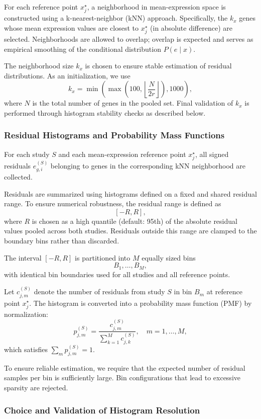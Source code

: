 For each reference point $x^\star_j$, a neighborhood in mean-expression space is constructed using a k-nearest-neighbor (kNN) approach. Specifically, the $k_x$ genes whose mean expression values are closest to $x^\star_j$ (in absolute difference) are selected. Neighborhoods are allowed to overlap; overlap is expected and serves as empirical smoothing of the conditional distribution $P(e \mid x)$.

The neighborhood size $k_x$ is chosen to ensure stable estimation of residual distributions. As an initialization, we use
\[
k_x = \min\!\left(\max\!\left(100,\left\lfloor \frac{N}{2r} \right\rfloor\right), 1000\right),
\]
where $N$ is the total number of genes in the pooled set. Final validation of $k_x$ is performed through histogram stability checks as described below.

\subsubsection{Residual Histograms and Probability Mass Functions}

For each study $S$ and each mean-expression reference point $x^\star_j$, all signed residuals $e^{(S)}_{g,i}$ belonging to genes in the corresponding kNN neighborhood are collected.

Residuals are summarized using histograms defined on a fixed and shared residual range. To ensure numerical robustness, the residual range is defined as
\[
[-R, R],
\]
where $R$ is chosen as a high quantile (default: 95th) of the absolute residual values pooled across both studies. Residuals outside this range are clamped to the boundary bins rather than discarded.

The interval $[-R, R]$ is partitioned into $M$ equally sized bins
\[
B_1, \ldots, B_M,
\]
with identical bin boundaries used for all studies and all reference points.

Let $c^{(S)}_{j,m}$ denote the number of residuals from study $S$ in bin $B_m$ at reference point $x^\star_j$. The histogram is converted into a probability mass function (PMF) by normalization:
\[
p^{(S)}_{j,m} = \frac{c^{(S)}_{j,m}}{\sum_{k=1}^{M} c^{(S)}_{j,k}}, \quad m=1,\ldots,M,
\]
which satisfies $\sum_m p^{(S)}_{j,m} = 1$.

To ensure reliable estimation, we require that the expected number of residual samples per bin is sufficiently large. Bin configurations that lead to excessive sparsity are rejected.

\subsubsection{Choice and Validation of Histogram Resolution}


